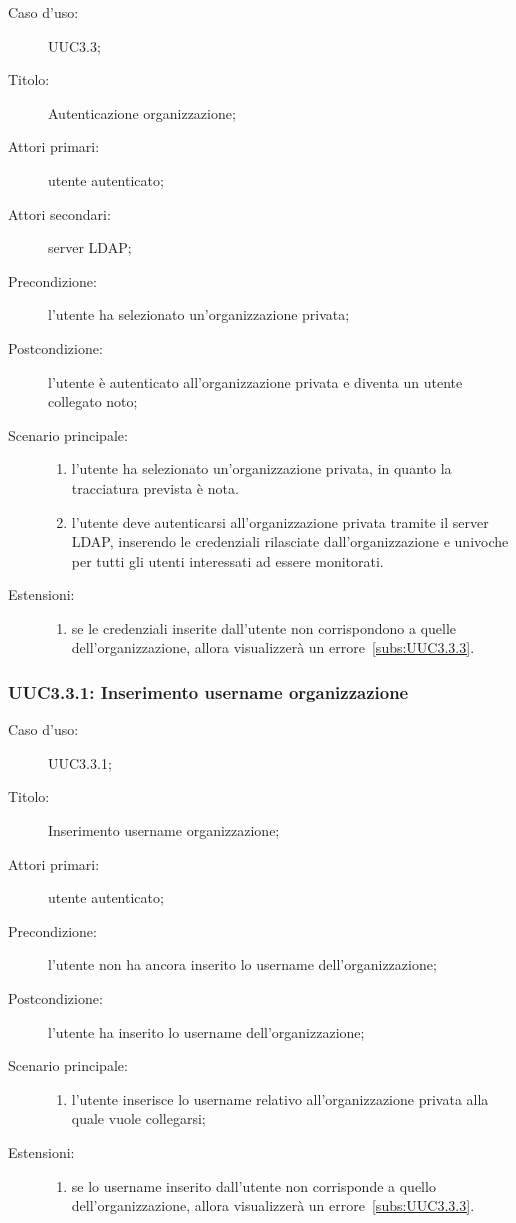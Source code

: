 \documentclass[../../../analisi-dei-requisiti.tex]{subfiles}
\begin{document}
\begin{description}
  \item[Caso d’uso:] UUC3.3;
  \item[Titolo:] Autenticazione organizzazione;
  \item[Attori primari:] utente autenticato;
  \item[Attori secondari:] server LDAP\@;
  \item[Precondizione:] l'utente ha selezionato un'organizzazione privata;
  \item[Postcondizione:] l'utente è autenticato all'organizzazione privata e diventa un utente collegato noto;
  \item[Scenario principale:]
        \begin{enumerate}
          \item l'utente ha selezionato un'organizzazione privata, in quanto la tracciatura prevista è nota.
          \item l'utente deve autenticarsi all'organizzazione privata tramite il server LDAP, inserendo le credenziali rilasciate dall'organizzazione e univoche per tutti gli utenti interessati ad essere monitorati.
        \end{enumerate}
  \item[Estensioni:]
        \begin{enumerate}
          \item se le credenziali inserite dall'utente non corrispondono a quelle dell'organizzazione, allora visualizzerà un errore~\ref{subs:UUC3.3.3}.
        \end{enumerate}
\end{description}

\subsubsection{UUC3.3.1: Inserimento username organizzazione}%
\label{subs:UUC3.3.1}
\begin{description}
  \item[Caso d’uso:] UUC3.3.1;
  \item[Titolo:] Inserimento username organizzazione;
  \item[Attori primari:] utente autenticato;
  \item[Precondizione:] l'utente non ha ancora inserito lo username dell'organizzazione;
  \item[Postcondizione:] l'utente ha inserito lo username dell'organizzazione;
  \item[Scenario principale:]
        \begin{enumerate}
          \item l'utente inserisce lo username relativo all'organizzazione privata alla quale vuole collegarsi;
        \end{enumerate}
  \item[Estensioni:]
        \begin{enumerate}
          \item se lo username inserito dall'utente non corrisponde a quello dell'organizzazione, allora visualizzerà un errore~\ref{subs:UUC3.3.3}.
        \end{enumerate}
\end{description}
\end{document}
